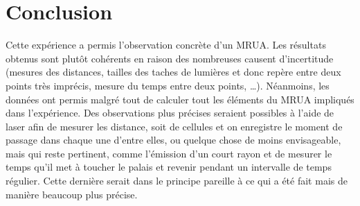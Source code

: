 \documentclass[11pt]{article}
\begin{document}
\section{Conclusion}
Cette expérience a permis l’observation concrète d’un MRUA. Les résultats obtenus sont plutôt cohérents en raison des nombreuses causent d’incertitude (mesures des distances, tailles des taches de lumières et donc repère entre deux points très imprécis, mesure du temps entre deux points, …). Néanmoins, les données ont permis malgré tout de calculer tout les éléments du MRUA impliqués dans l’expérience. Des observations plus précises seraient possibles à l’aide de laser afin de mesurer les distance, soit de cellules et on enregistre le moment de passage dans chaque une d’entre elles, ou quelque chose de moins envisageable, mais qui reste pertinent, comme l’émission d’un court rayon et de mesurer le temps qu’il met à toucher le palais et revenir pendant un intervalle de temps régulier. Cette dernière serait dans le principe pareille à ce qui a été fait mais de manière beaucoup plus précise.
\end{document}
